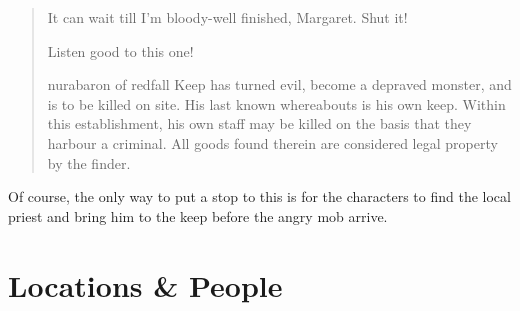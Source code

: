 \begin{multicols}{2}
\begin{boxtext}
\begin{verse}
		It can wait till I'm bloody-well finished, Margaret.  Shut it!

		Listen good to this one!

		\gls{nurabaron} of \gls{redfall} Keep has turned evil, become a depraved monster, and is to be killed on site.  His last known whereabouts is his own keep.  Within this establishment, his own staff may be killed on the basis that they harbour a criminal.  All goods found therein are considered legal property by the finder.

	\end{verse}
\end{boxtext}

Of course, the only way to put a stop to this is for the characters to find the local priest and bring him to the keep before the angry mob arrive.

%
%
%
%
%

\end{multicols}

\section{Locations \& People}

\label{redfall_map}

\subsection{}

